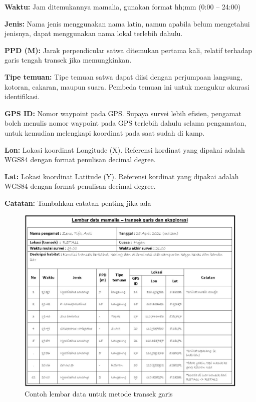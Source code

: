 \documentclass[
  oneside]{book}
\begin{document}
\textbf{Waktu:} Jam ditemukannya mamalia, gunakan format hh;mm (0:00 -- 24:00)

\textbf{Jenis:} Nama jenis menggunakan nama latin, namun apabila belum mengetahui jenisnya, dapat menggunakan nama lokal terlebih dahulu.

\textbf{PPD (M):} Jarak perpendicular satwa ditemukan pertama kali, relatif terhadap garis tengah transek jika memungkinkan.

\textbf{Tipe temuan:} Tipe temuan satwa dapat diisi dengan perjumpaan langsung, kotoran, cakaran, maupun suara. Pembeda temuan ini untuk mengukur akurasi identifikasi.

\textbf{GPS ID:} Nomor waypoint pada GPS. Supaya survei lebih efisien, pengamat boleh menulis nomor waypoint pada GPS terlebih dahulu selama pengamatan, untuk kemudian melengkapi koordinat pada saat sudah di kamp.

\textbf{Lon:} Lokasi koordinat Longitude (X). Referensi kordinat yang dipakai adalah WGS84 dengan format penulisan decimal degree.

\textbf{Lat:} Lokasi koordinat Latitude (Y). Referensi kordinat yang dipakai adalah WGS84 dengan format penulisan decimal degree.

\textbf{Catatan:} Tambahkan catatan penting jika ada

\begin{figure}

{\centering \includegraphics[width=1\linewidth]{images/ldm_tg} 

}

\caption{Contoh lembar data untuk metode transek garis}\label{fig:ldmtg}
\end{figure}
\end{document}
